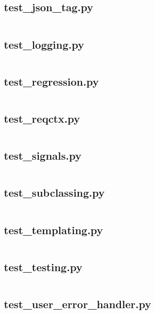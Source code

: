 \documentclass{article}
\begin{document}
\subsection{test\_json\_tag.py}
\inputminted{python}{/tmp/flask/tests/test_json_tag.py}
\newpage

\subsection{test\_logging.py}
\inputminted{python}{/tmp/flask/tests/test_logging.py}
\newpage

\subsection{test\_regression.py}
\inputminted{python}{/tmp/flask/tests/test_regression.py}
\newpage

\subsection{test\_reqctx.py}
\inputminted{python}{/tmp/flask/tests/test_reqctx.py}
\newpage

\subsection{test\_signals.py}
\inputminted{python}{/tmp/flask/tests/test_signals.py}
\newpage

\subsection{test\_subclassing.py}
\inputminted{python}{/tmp/flask/tests/test_subclassing.py}
\newpage

\subsection{test\_templating.py}
\inputminted{python}{/tmp/flask/tests/test_templating.py}
\newpage

\subsection{test\_testing.py}
\inputminted{python}{/tmp/flask/tests/test_testing.py}
\newpage

\subsection{test\_user\_error\_handler.py}
\inputminted{python}{/tmp/flask/tests/test_user_error_handler.py}
\newpage
\end{document}
